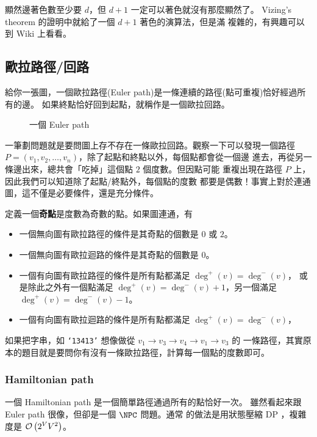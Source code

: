 \documentclass[a4paper,12pt]{book}
\begin{document}
顯然邊著色數至少要 $d$，但 $d+1$ 一定可以著色就沒有那麼顯然了。
Vizing's theorem 的證明中就給了一個 $d+1$ 著色的演算法，但是滿
複雜的，有興趣可以到 Wiki 上看看。

\subsection{歐拉路徑/回路}
給你一張圖，一個歐拉路徑(Euler path)是一條連續的路徑(點可重複)恰好經過所有的邊。
如果終點恰好回到起點，就稱作是一個歐拉回路。

\begin{figure}[H]
  \centering
  
  \caption{一個 Euler path}
\end{figure}

一筆劃問題就是要問圖上存不存在一條歐拉回路。觀察一下可以發現一個路徑
$P = (v_1, v_2, \dots, v_n)$，除了起點和終點以外，每個點都會從一個邊
進去，再從另一條邊出來，總共會「吃掉」這個點 $2$ 個度數。但因點可能
重複出現在路徑 $P$ 上，因此我們可以知道除了起點/終點外，每個點的度數
都要是偶數！事實上對於連通圖，這不僅是必要條件，還是充分條件。

\begin{theorem}
  定義一個{\bf 奇點}是度數為奇數的點。如果圖連通，有
  \begin{itemize}
    \item 一個無向圖有歐拉路徑的條件是其奇點的個數是 $0$ 或 $2$。
    \item 一個無向圖有歐拉迴路的條件是其奇點的個數是 $0$。
    \item 一個有向圖有歐拉路徑的條件是所有點都滿足 $\deg^+(v) = \deg^-(v)$，
      或是除此之外有一個點滿足 $\deg^+(v) = \deg^-(v) + 1$，另一個滿足
      $\deg^+(v) = \deg^-(v) - 1$。
    \item 一個有向圖有歐拉迴路的條件是所有點都滿足 $\deg^+(v) = \deg^-(v)$，
  \end{itemize}
\end{theorem}



如果把字串，如 \texttt{`13413'} 想像做從 $v_1 \to v_3 \to v_4 \to v_1 \to v_3$ 的
一條路徑，其實原本的題目就是要問你有沒有一條歐拉路徑，計算每一個點的度數即可。

\subsubsection{Hamiltonian path}
一個 Hamiltonian path 是一個簡單路徑通過所有的點恰好一次。
雖然看起來跟 Euler path 很像，但卻是一個 $\NPC$ 問題。通常
的做法是用狀態壓縮 DP ，複雜度是 $\operatorname{\mathcal{O}}\left(2^V V^2\right)$。
\end{document}
